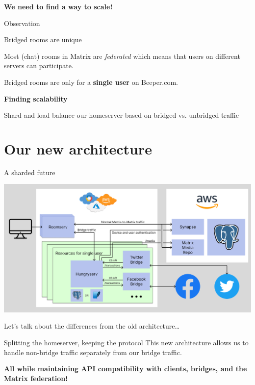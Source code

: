 \documentclass{beeper}
\begin{document}
\begingroup
\def\insertframenumber{\relax}
\begin{frame}[standout]
    \textbf{\LARGE We need to find a way to scale!}
\end{frame}
\endgroup

\begin{frame}{Observation}
    \begin{center}
        \LARGE Bridged rooms are unique
    \end{center}
    \pause

    Most (chat) rooms in Matrix are \textit{federated} which means that users on
    different servers can participate.
    \pause

    Bridged rooms are only for a \textbf{single user} on Beeper.com.
\end{frame}

\begingroup
\def\insertframenumber{\relax}
\begin{frame}[standout]
    \textbf{\LARGE Finding scalability}

    Shard and load-balance our homeserver based on bridged vs. unbridged traffic
\end{frame}
\endgroup

\section{Our new architecture}

\begin{frame}{A sharded future}
    \centerline{\includegraphics[width=1.15\textwidth]{images/new-architecture}}

    Let's talk about the differences from the old architecture\ldots
\end{frame}

\begin{frame}{Splitting the homeserver, keeping the protocol}
    \Large
    \centering
    This new architecture allows us to handle non-bridge traffic separately from
    our bridge traffic.
    \pause

    \textbf{All while maintaining API compatibility with clients, bridges, and
    the Matrix federation!}
\end{frame}
\end{document}
